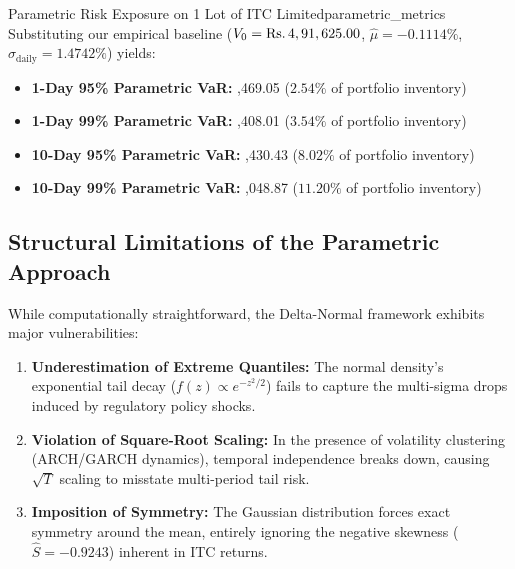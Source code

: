 \begin{empiricalbox}{Parametric Risk Exposure on 1 Lot of ITC Limited}{parametric_metrics}
Substituting our empirical baseline ($V_0 = \text{\text{Rs.}\,}4,91,625.00$, $\hat{\mu} = -0.1114\%$, $\hat{\sigma}_{\text{daily}} = 1.4742\%$) yields:
\begin{itemize}[leftmargin=1.5em, itemsep=1pt, parsep=0pt]
    \item \textbf{1-Day 95\% Parametric VaR:} ,469.05 ($2.54\%$ of portfolio inventory)
    \item \textbf{1-Day 99\% Parametric VaR:} ,408.01 ($3.54\%$ of portfolio inventory)
    \item \textbf{10-Day 95\% Parametric VaR:} ,430.43 ($8.02\%$ of portfolio inventory)
    \item \textbf{10-Day 99\% Parametric VaR:} ,048.87 ($11.20\%$ of portfolio inventory)
\end{itemize}
\end{empiricalbox}

\subsection{Structural Limitations of the Parametric Approach}

While computationally straightforward, the Delta-Normal framework exhibits major vulnerabilities:
\begin{enumerate}[leftmargin=1.5em, itemsep=1.5pt, parsep=0pt, label=(\roman*)]
    \item \textbf{Underestimation of Extreme Quantiles:} The normal density's exponential tail decay ($f(z) \propto e^{-z^2/2}$) fails to capture the multi-sigma drops induced by regulatory policy shocks.
    \item \textbf{Violation of Square-Root Scaling:} In the presence of volatility clustering (ARCH/GARCH dynamics), temporal independence breaks down, causing $\sqrt{T}$ scaling to misstate multi-period tail risk.
    \item \textbf{Imposition of Symmetry:} The Gaussian distribution forces exact symmetry around the mean, entirely ignoring the negative skewness ($\hat{S} = -0.9243$) inherent in ITC returns.
\end{enumerate}

\clearpage
